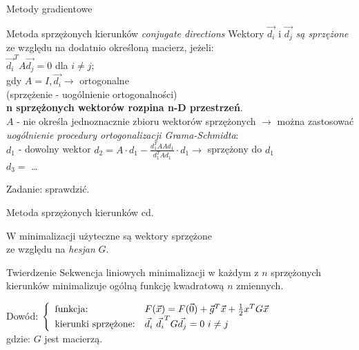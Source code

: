   \begin{frame}{Metody gradientowe}

 	\begin{block}{Metoda sprzężonych kierunków \emph{conjugate directions}}
 	   Wektory $\vec{d_i}$ i $\vec{d_j}$ \emph{są sprzężone} ze względu na dodatnio określoną macierz, jeżeli:
 	   \\$\vec{d_i}^T A\vec{d_j} = 0$ dla $i \neq j$;
 	   \\gdy $A = I, \vec{d_i} \rightarrow$ ortogonalne
 	   \\(sprzężenie - uogólnienie ortogonalności)
 	   \\ \textbf{n sprzężonych wektorów rozpina n-D przestrzeń}.
 	   \\$A$ - nie określa jednoznacznie zbioru wektorów sprzężonych $\rightarrow$ można zastosować
 	   \emph{uogólnienie procedury ortogonalizacji Grama-Schmidta}:
 	   \\$d_1$ - dowolny wektor $d_2 = A \cdot d_1 - \frac{d_1^T A A d_1}{d_1^T A d_1} \cdot d_1 \rightarrow$ sprzężony do $d_1$
 	   \\$d_3 =$ \ldots
 	   \begin{flushright}
 	      Zadanie: sprawdzić.
 	   \end{flushright}
 	\end{block}

  \end{frame}

  \begin{frame}{Metoda sprzężonych kierunków cd.}

    W minimalizacji użyteczne są wektory sprzężone
    \\ze względu na \emph{hesjan} $G$.
 	\begin{block}{Twierdzenie}
 	   Sekwencja liniowych minimalizacji w każdym z $n$ sprzężonych kierunków minimalizuje ogólną funkcję kwadratową $n$ zmiennych.
 	\end{block}
 	\begin{block}{Dowód:}
 	   $\left\{
        \begin{array}{l l}
          \text{funkcja:} & F(\vec{x}) = F(\vec{0}) + \vec{g}^T \vec{x} + \frac{1}{2} x^T G \vec{x} \\
          \text{kierunki sprzężone:} & \vec{d_i} \ \vec{d_i}^T G \vec{d_j} = 0 \ i \neq j
	    \end{array}
	  \right.$
	  \\gdzie: $G$ jest macierzą.
 	\end{block}

  \end{frame}

